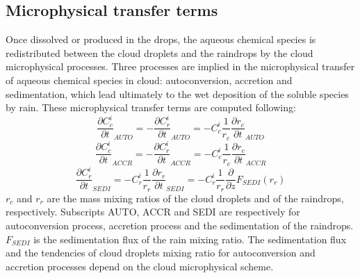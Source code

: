\subsection{Microphysical transfer terms}
Once dissolved or produced in the drops, the aqueous chemical species is redistributed between the cloud droplets and the raindrops by the cloud microphysical processes. Three processes are implied in the microphysical transfer of aqueous chemical species in cloud: autoconversion, accretion and sedimentation, which lead ultimately to the wet deposition of the soluble species by rain. These microphysical transfer terms are computed following:
\begin{equation}
\frac{\partial C_{c}^{i}}{\partial t}_{AUTO}=-\frac{\partial C_{r}^{i}}{\partial t}_{AUTO}=-C_{c}^{i}\frac{1}{r_{c}}\frac{\partial r_{c}}{\partial t}_{AUTO}
\end{equation}
\begin{equation}
\frac{\partial C_{c}^{i}}{\partial t}_{ACCR}=-\frac{\partial C_{r}^{i}}{\partial t}_{ACCR}=-C_{c}^{i}\frac{1}{r_{c}}\frac{\partial r_{c}}{\partial t}_{ACCR}
\end{equation}
\begin{equation}
\frac{\partial C_{r}^{i}}{\partial t}_{SEDI}=-C_{r}^{i}\frac{1}{r_{r}}\frac{\partial r_{r}}{\partial t}_{SEDI}=-C_{r}^{i}\frac{1}{r_{r}}\frac{\partial }{\partial z}F_{SEDI}\left ( r_{r} \right )
\end{equation}
$r_{c}$ and $r_{r}$ are the mass mixing ratios of the cloud droplets and of the raindrops, respectively. Subscripts AUTO, ACCR and SEDI are respectively for autoconversion process, accretion process and the sedimentation of the raindrops. $F_{SEDI}$ is the sedimentation flux of the rain mixing ratio. The sedimentation flux and the tendencies of cloud droplets mixing ratio for autoconversion and accretion processes depend on the cloud microphysical scheme. 

